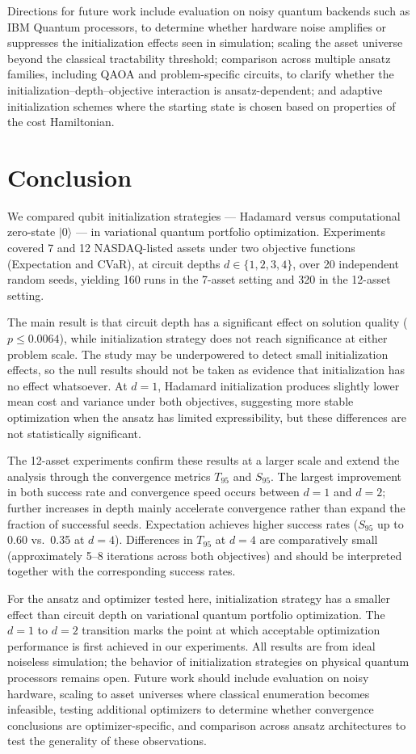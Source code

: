 \documentclass[runningheads]{llncs}
\begin{document}
Directions for future work include evaluation on noisy quantum backends such as IBM Quantum processors, to determine whether hardware noise amplifies or suppresses the initialization effects seen in simulation; scaling the asset universe beyond the classical tractability threshold; comparison across multiple ansatz families, including QAOA and problem-specific circuits, to clarify whether the initialization--depth--objective interaction is ansatz-dependent; and adaptive initialization schemes where the starting state is chosen based on properties of the cost Hamiltonian.
\section{Conclusion}

We compared qubit initialization strategies --- Hadamard \cite{nielsen2010} versus computational zero-state $|0\rangle$ --- in variational quantum portfolio optimization. Experiments covered 7 and 12 NASDAQ-listed assets under two objective functions (Expectation and CVaR), at circuit depths $d \in \{1, 2, 3, 4\}$, over 20 independent random seeds, yielding 160 runs in the 7-asset setting and 320 in the 12-asset setting.

The main result is that circuit depth has a significant effect on solution quality ($p \leq 0.0064$), while initialization strategy does not reach significance at either problem scale. The study may be underpowered to detect small initialization effects, so the null results should not be taken as evidence that initialization has no effect whatsoever. At $d = 1$, Hadamard initialization produces slightly lower mean cost and variance under both objectives, suggesting more stable optimization when the ansatz has limited expressibility, but these differences are not statistically significant.

The 12-asset experiments confirm these results at a larger scale and extend the analysis through the convergence metrics $T_{95}$ and $S_{95}$. The largest improvement in both success rate and convergence speed occurs between $d = 1$ and $d = 2$; further increases in depth mainly accelerate convergence rather than expand the fraction of successful seeds. Expectation achieves higher success rates ($S_{95}$ up to 0.60 vs.\ 0.35 at $d = 4$). Differences in $T_{95}$ at $d = 4$ are comparatively small (approximately 5--8 iterations across both objectives) and should be interpreted together with the corresponding success rates.

For the ansatz and optimizer tested here, initialization strategy has a smaller effect than circuit depth on variational quantum portfolio optimization. The $d = 1$ to $d = 2$ transition marks the point at which acceptable optimization performance is first achieved in our experiments. All results are from ideal noiseless simulation; the behavior of initialization strategies on physical quantum processors remains open. Future work should include evaluation on noisy hardware, scaling to asset universes where classical enumeration becomes infeasible, testing additional optimizers to determine whether convergence conclusions are optimizer-specific, and comparison across ansatz architectures to test the generality of these observations.
\end{document}
